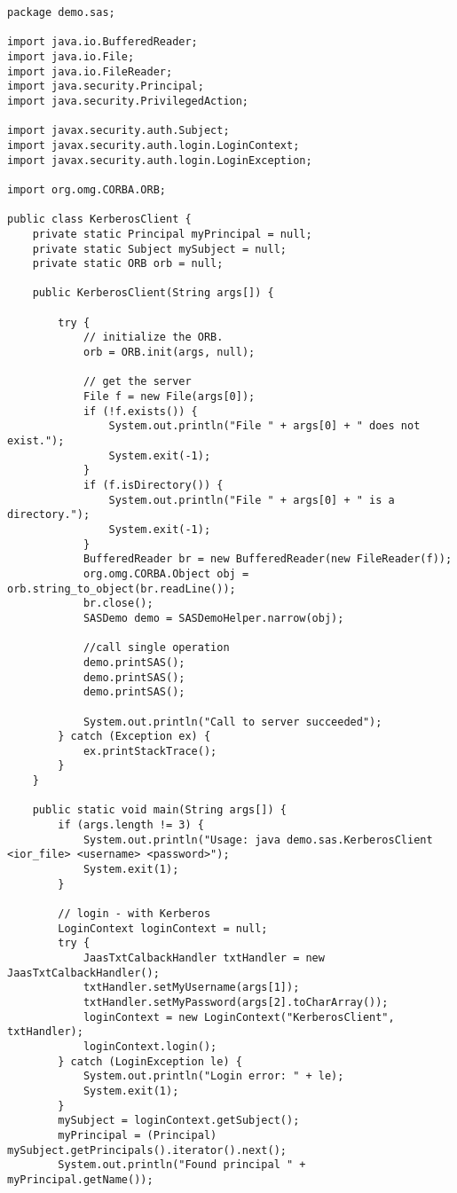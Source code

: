 \begin{scriptsize}
\begin{verbatim}
package demo.sas;

import java.io.BufferedReader;
import java.io.File;
import java.io.FileReader;
import java.security.Principal;
import java.security.PrivilegedAction;

import javax.security.auth.Subject;
import javax.security.auth.login.LoginContext;
import javax.security.auth.login.LoginException;

import org.omg.CORBA.ORB;

public class KerberosClient {
    private static Principal myPrincipal = null; 
    private static Subject mySubject = null;	
    private static ORB orb = null;
	
    public KerberosClient(String args[]) {

        try {
            // initialize the ORB.
            orb = ORB.init(args, null);

            // get the server
            File f = new File(args[0]);
            if (!f.exists()) {
                System.out.println("File " + args[0] + " does not exist.");
                System.exit(-1);
            }
            if (f.isDirectory()) {
                System.out.println("File " + args[0] + " is a directory.");
                System.exit(-1);
            }
            BufferedReader br = new BufferedReader(new FileReader(f));
            org.omg.CORBA.Object obj = orb.string_to_object(br.readLine());
            br.close();
            SASDemo demo = SASDemoHelper.narrow(obj);

            //call single operation
            demo.printSAS();
            demo.printSAS();
            demo.printSAS();

            System.out.println("Call to server succeeded");
        } catch (Exception ex) {
            ex.printStackTrace();
        }
    }
	
    public static void main(String args[]) {
        if (args.length != 3) {
            System.out.println("Usage: java demo.sas.KerberosClient <ior_file> <username> <password>");
            System.exit(1);
        }

        // login - with Kerberos
        LoginContext loginContext = null;
        try {
            JaasTxtCalbackHandler txtHandler = new JaasTxtCalbackHandler();
            txtHandler.setMyUsername(args[1]);
            txtHandler.setMyPassword(args[2].toCharArray());
            loginContext = new LoginContext("KerberosClient", txtHandler);
            loginContext.login();
        } catch (LoginException le) {
            System.out.println("Login error: " + le);
            System.exit(1);
        }
        mySubject = loginContext.getSubject();
        myPrincipal = (Principal) mySubject.getPrincipals().iterator().next();
        System.out.println("Found principal " + myPrincipal.getName());


\end{verbatim}
\end{scriptsize}
